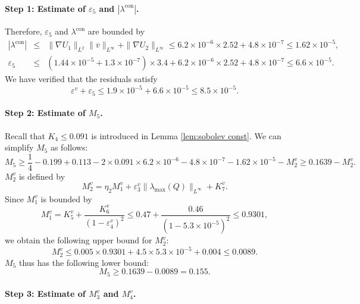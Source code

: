 \documentclass[11pt,a4paper]{article}
\numberwithin{equation}{section}
\newcommand{\tmop}[1]{\ensuremath{\operatorname{#1}}}
\begin{document}
\paragraph{Step 1: Estimate of $\varepsilon_{5}$ and $|
\lambda^{\tmop{con}} |$.}

Therefore, $\varepsilon_5$ and $\lambda^{\tmop{con}}$ are bounded by
\begin{eqnarray*}
  | \lambda^{\tmop{con}} | & \leqslant & \| \nabla U_1\|_{L^2} \| \overline{v} \|_{L^\infty} + \| \nabla U_2\|_{L^\infty}
  \leqslant 6.2 \times 10^{- 6} \times 2.52 + 4.8 \times 10^{-7} \leqslant 1.62 \times 10^{- 5},\\
  \varepsilon_5 & \leqslant & (1.44 \times
  10^{- 5} + 1.3 \times 10^{-7}) \times 3.4 + 6.2 \times 10^{- 6} \times 2.52 + 4.8 \times 10^{-7} \leqslant 6.6 \times 10^{-5}.
\end{eqnarray*}
We have verified that the residuals satisfy
\[ 
\varepsilon^v+\varepsilon_5 \leqslant 1.9 \times 10^{- 5} + 6.6 \times 10^{-5} \leqslant 8.5 \times 10^{-5}.
\]

\paragraph{Step 2: Estimate of $M_5$.}

Recall that $K_4 \leqslant 0.091$ is introduced in Lemma \ref{lem:sobolev const}. We can
simplify $M_5$ as follows:
\[ M_5 \geqslant \frac{1}{4} - 0.199 + 0.113 - 2 \times 0.091 \times 6.2
   \times 10^{- 6} - 4.8 \times 10^{-7} - 1.62 \times 10^{- 5} - M_2^v \geqslant 0.1639 - M_2^v . \]
$M_2^v$ is defined by
\[ M_2^v = \eta_2 M_1^v + \varepsilon_3^v \| \lambda_{\max} (Q) \|_{L^\infty} +
   K_7^v. \]
Since $M_1^v$ is bounded by
\[
M_1^v = K^v_5 + \frac{K_6^v}{(1 - \varepsilon^v_4)^2} \leqslant 0.47 + \frac{0.46}{(1 - 5.3 \times 10^{- 5})^2} \leqslant
  0.9301,
\]
we obtain the following upper bound for $M_2^v$:
\[
M_2^v \leqslant 0.005 \times 0.9301 + 4.5 \times 5.3 \times 10^{- 5} + 0.004
  \leqslant 0.0089.
\]
$M_5$ thus has the following lower bound:
\[ M_5 \geqslant 0.1639 - 0.0089 = 0.155. \]

\paragraph{Step 3: Estimate of $M_3^v$ and $M_4^v$.}
\end{document}

